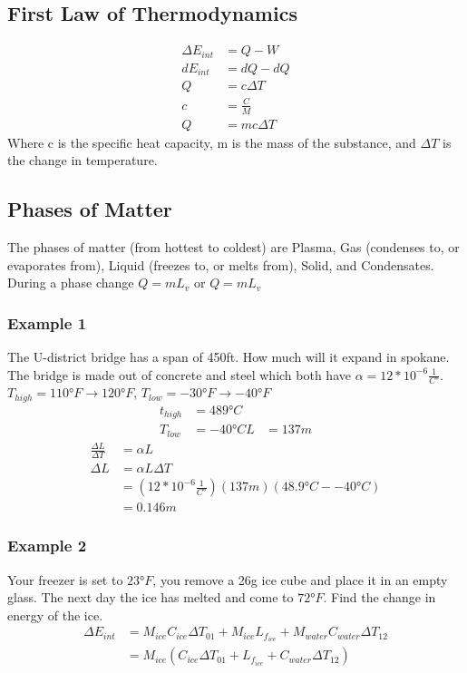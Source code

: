 	\subsection{First Law of Thermodynamics}
	\begin{align*}
	\Delta E_{int} &= Q-W\\
	dE_{int} &= dQ-dQ\\
	Q &=c \Delta T\\
	c &= \frac{C}{M}\\
	Q &= mc\Delta T
	\end{align*}
	Where c is the specific heat capacity, m is the mass of the substance, and $\Delta T$ is the change in temperature.
	\subsection{Phases of Matter}
	The phases of matter (from hottest to coldest) are Plasma, Gas (condenses to, or evaporates from), Liquid (freezes to, or melts from), Solid, and Condensates. During a phase change $Q=mL_v$ or $Q=mL_v$
	\subsubsection{Example 1}
	The U-district bridge has a span of 450ft. How much will it expand in spokane. The bridge is made out of concrete and steel which both have $\alpha = 12*10^{-6}\frac{1}{C\si{\degree}}$. $T_{high}=110\si{\degree}F \to 120\si{\degree}F$, $T_{low}=-30\si{\degree}F \to -40\si{\degree}F$
	\begin{align*}
	t_{high}&=489\si{\degree}C\\
	T_{low}&=-40\si{\degree}C
	L&=137m
	\end{align*}
	\newline
	\newline
	\begin{align*}
	\frac{\Delta L}{\Delta T}&=\alpha L\\
	\Delta L&=\alpha L\Delta T\\
	&=\left(12*10^{-6}\frac{1}{C\si{\degree}}\right)(137m)(48.9\si{\degree}C--40\si{\degree}C)\\
	&=0.146m
	\end{align*}
	\subsubsection{Example 2}
	Your freezer is set to $23\si{\degree}F$, you remove a 26g ice cube and place it in an empty glass. The next day the ice has melted and come to $72\si{\degree}F$. Find the change in energy of the ice.
	\begin{align*}
	\Delta E_{int}&=M_{ice}C_{ice} \Delta T_{01}+M_{ice}L_{f_{ice}}+M_{water}C_{water} \Delta T_{12}\\
	&=M_{ice}(C_{ice}\Delta T_{01}+L_{f_{ice}}+C_{water} \Delta T_{12})
	\end{align*}


